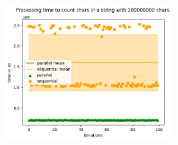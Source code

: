 \documentclass[plainarticle,zihtitle,german,final,hyperref,utf8]{zihpub}
\begin{document}
\begin{figure}[h]
	\begin{center}
		\includegraphics[width=0.65\textwidth]{images/comp_count_100000000.png}
	\end{center}
\end{figure}
\end{document}
